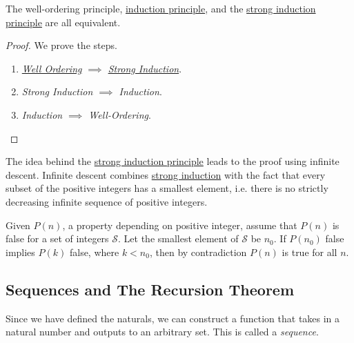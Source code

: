   \begin{theorem}
    \label{thm:equivalence-of-3-principles}
    The well-ordering principle, \hyperref[thm:induction-principle]{induction principle}, and the \hyperref[thm:strong-induction-principle]{strong induction principle} are all equivalent. 
  \end{theorem}
  \begin{proof}
    We prove the steps. 
    \begin{enumerate}
      \item \textit{\hyperref[thm:well-ordering-principle]{Well Ordering} $\implies$ \hyperref[thm:strong-induction-principle]{Strong Induction}}. 
      \item \textit{Strong Induction $\implies$ Induction}.  
      \item \textit{Induction $\implies$ Well-Ordering}. 
    \end{enumerate}
  \end{proof}

  The idea behind the \hyperref[thm:strong-induction-principle]{strong induction principle} leads to the proof using infinite descent. Infinite descent combines \hyperref[thm:strong-induction-principle]{strong induction} with the fact that every subset of the positive integers has a smallest element, i.e. there is no strictly decreasing infinite sequence of positive integers. 

  \begin{theorem}
    \label{thm:infinite-descent}
    Given $P(n)$, a property depending on positive integer, assume that $P(n)$ is false for a set of integers $\mathcal{S}$. Let the smallest element of $\mathcal{S}$ be $n_0$. If $P(n_0)$ false implies $P(k)$ false, where $k < n_0$, then by contradiction $P(n)$ is true for all $n$. 
  \end{theorem} 

\subsection{Sequences and The Recursion Theorem}

  Since we have defined the naturals, we can construct a function that takes in a natural number and outputs to an arbitrary set. This is called a \textit{sequence}. 

